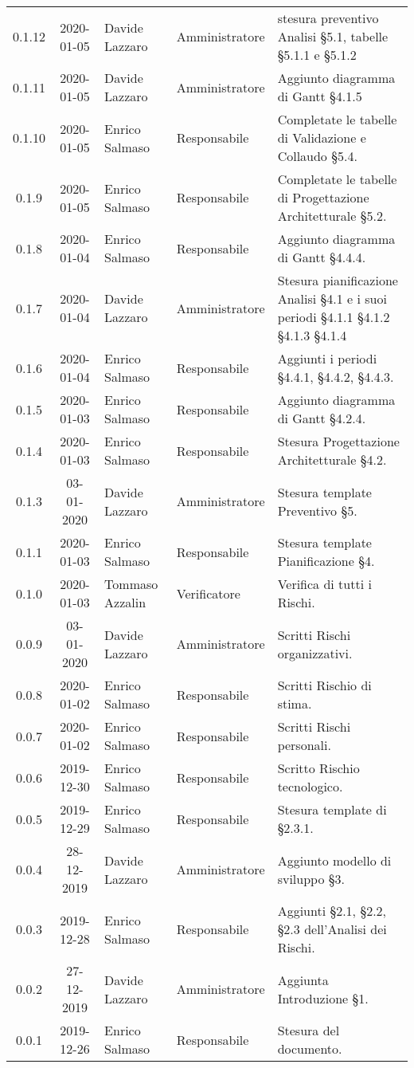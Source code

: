 {\begin{longtable}{ c c  C{4cm}  C{3cm} C{4cm}}
0.1.12 & 2020-01-05 & Davide Lazzaro & Amministratore & stesura preventivo Analisi §5.1, tabelle §5.1.1 e §5.1.2 \\
0.1.11 & 2020-01-05 & Davide Lazzaro & Amministratore & Aggiunto diagramma di Gantt §4.1.5 \\
0.1.10 & 2020-01-05 & Enrico Salmaso & Responsabile & Completate le tabelle di Validazione e Collaudo §5.4.\\
0.1.9 & 2020-01-05 & Enrico Salmaso & Responsabile & Completate le tabelle di Progettazione Architetturale §5.2.\\
0.1.8 & 2020-01-04 & Enrico Salmaso & Responsabile & Aggiunto diagramma di Gantt §4.4.4. \\
0.1.7 & 2020-01-04 & Davide Lazzaro & Amministratore & Stesura pianificazione Analisi §4.1 e i suoi periodi §4.1.1 §4.1.2 §4.1.3 §4.1.4 \\
0.1.6 & 2020-01-04 & Enrico Salmaso & Responsabile & Aggiunti i periodi §4.4.1, §4.4.2, §4.4.3.\\
0.1.5 & 2020-01-03 & Enrico Salmaso & Responsabile & Aggiunto diagramma di Gantt §4.2.4.\\
0.1.4 & 2020-01-03 & Enrico Salmaso & Responsabile & Stesura Progettazione Architetturale §4.2.\\
0.1.3 & 03-01-2020 & Davide Lazzaro & Amministratore & Stesura template Preventivo §5.\\
0.1.1 & 2020-01-03 &  Enrico Salmaso & Responsabile & Stesura template Pianificazione §4.\\
0.1.0 & 2020-01-03 & Tommaso Azzalin & Verificatore & Verifica di tutti i Rischi.  \\
0.0.9 & 03-01-2020 & Davide Lazzaro & Amministratore & Scritti Rischi organizzativi. \\
0.0.8 & 2020-01-02 &  Enrico Salmaso & Responsabile & Scritti Rischio di stima. \\
0.0.7 & 2020-01-02 & Enrico Salmaso & Responsabile & Scritti Rischi personali. \\
0.0.6 & 2019-12-30 & Enrico Salmaso & Responsabile & Scritto Rischio tecnologico. \\
0.0.5 & 2019-12-29 & Enrico Salmaso & Responsabile & Stesura template di §2.3.1.\\
0.0.4 & 28-12-2019 & Davide Lazzaro & Amministratore & Aggiunto modello di sviluppo §3.\\
0.0.3 & 2019-12-28 & Enrico Salmaso & Responsabile & Aggiunti §2.1, §2.2, §2.3 dell'Analisi dei Rischi. \\
0.0.2 & 27-12-2019 & Davide Lazzaro & Amministratore & Aggiunta Introduzione §1. \\
0.0.1 & 2019-12-26 & Enrico Salmaso & Responsabile & Stesura del documento.  \\
		
\end{longtable}
}